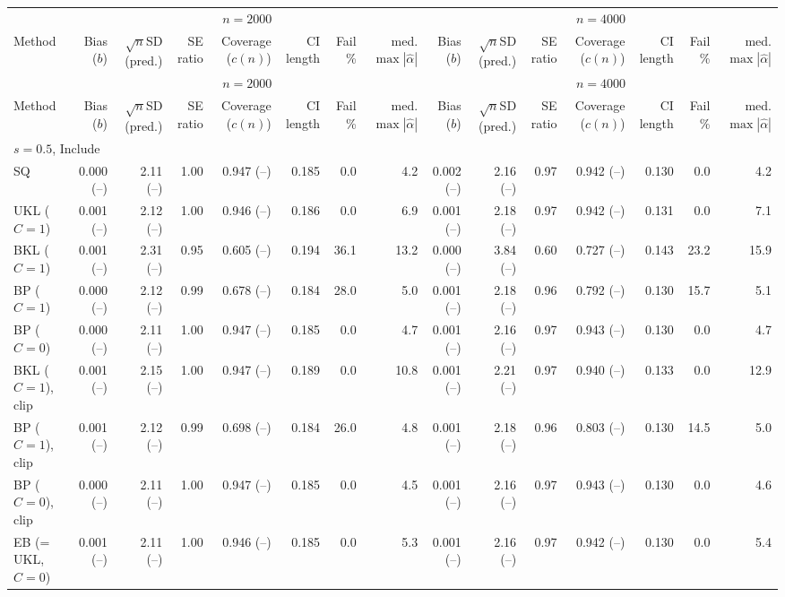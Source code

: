 \begin{tabular}{lrrrrrrrrrrrrrr}
\hline
 & \multicolumn{7}{c}{$n=2000$} & \multicolumn{7}{c}{$n=4000$} \\
Method & Bias ($b$) & $\sqrt{n}$SD (pred.) & SE ratio & Coverage ($c(n)$) & CI length & Fail \% & med. $\max|\widehat\alpha|$ & Bias ($b$) & $\sqrt{n}$SD (pred.) & SE ratio & Coverage ($c(n)$) & CI length & Fail \% & med. $\max|\widehat\alpha|$ \\
\hline
\endfirsthead
\hline
 & \multicolumn{7}{c}{$n=2000$} & \multicolumn{7}{c}{$n=4000$} \\
Method & Bias ($b$) & $\sqrt{n}$SD (pred.) & SE ratio & Coverage ($c(n)$) & CI length & Fail \% & med. $\max|\widehat\alpha|$ & Bias ($b$) & $\sqrt{n}$SD (pred.) & SE ratio & Coverage ($c(n)$) & CI length & Fail \% & med. $\max|\widehat\alpha|$ \\
\hline
\endhead
\multicolumn{15}{l}{$s=0.5$, Include} \\
SQ & 0.000 (--) & 2.11 (--) & 1.00 & 0.947 (--) & 0.185 & 0.0 & 4.2 & 0.002 (--) & 2.16 (--) & 0.97 & 0.942 (--) & 0.130 & 0.0 & 4.2 \\
UKL ($C=1$) & 0.001 (--) & 2.12 (--) & 1.00 & 0.946 (--) & 0.186 & 0.0 & 6.9 & 0.001 (--) & 2.18 (--) & 0.97 & 0.942 (--) & 0.131 & 0.0 & 7.1 \\
BKL ($C=1$) & 0.001 (--) & 2.31 (--) & 0.95 & 0.605 (--) & 0.194 & 36.1 & 13.2 & 0.000 (--) & 3.84 (--) & 0.60 & 0.727 (--) & 0.143 & 23.2 & 15.9 \\
BP ($C=1$) & 0.000 (--) & 2.12 (--) & 0.99 & 0.678 (--) & 0.184 & 28.0 & 5.0 & 0.001 (--) & 2.18 (--) & 0.96 & 0.792 (--) & 0.130 & 15.7 & 5.1 \\
BP ($C=0$) & 0.000 (--) & 2.11 (--) & 1.00 & 0.947 (--) & 0.185 & 0.0 & 4.7 & 0.001 (--) & 2.16 (--) & 0.97 & 0.943 (--) & 0.130 & 0.0 & 4.7 \\
BKL ($C=1$), clip & 0.001 (--) & 2.15 (--) & 1.00 & 0.947 (--) & 0.189 & 0.0 & 10.8 & 0.001 (--) & 2.21 (--) & 0.97 & 0.940 (--) & 0.133 & 0.0 & 12.9 \\
BP ($C=1$), clip & 0.001 (--) & 2.12 (--) & 0.99 & 0.698 (--) & 0.184 & 26.0 & 4.8 & 0.001 (--) & 2.18 (--) & 0.96 & 0.803 (--) & 0.130 & 14.5 & 5.0 \\
BP ($C=0$), clip & 0.000 (--) & 2.11 (--) & 1.00 & 0.947 (--) & 0.185 & 0.0 & 4.5 & 0.001 (--) & 2.16 (--) & 0.97 & 0.943 (--) & 0.130 & 0.0 & 4.6 \\
EB (= UKL, $C=0$) & 0.001 (--) & 2.11 (--) & 1.00 & 0.946 (--) & 0.185 & 0.0 & 5.3 & 0.001 (--) & 2.16 (--) & 0.97 & 0.942 (--) & 0.130 & 0.0 & 5.4 \\

\end{tabular}
